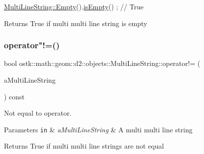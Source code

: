 \begin{DoxyCode}
\hyperlink{classostk_1_1math_1_1geom_1_1d2_1_1objects_1_1_multi_line_string_a1f0815649194309c185ac3020b9d80a2}{MultiLineString::Empty}().\hyperlink{classostk_1_1math_1_1geom_1_1d2_1_1objects_1_1_multi_line_string_a5d9130266958b3cddbcfd9ac085074f9}{isEmpty}() ; \textcolor{comment}{// True}
\end{DoxyCode}


\begin{DoxyReturn}{Returns}
True if multi multi line string is empty 
\end{DoxyReturn}
\mbox{\label{classostk_1_1math_1_1geom_1_1d2_1_1objects_1_1_multi_line_string_a124780190c563f303f81bff8e25ed742}} 
\subsubsection{\texorpdfstring{operator"!=()}{operator!=()}}
{\footnotesize\ttfamily bool ostk\+::math\+::geom\+::d2\+::objects\+::\+Multi\+Line\+String\+::operator!= (\begin{DoxyParamCaption}\item[{const \hyperlink{classostk_1_1math_1_1geom_1_1d2_1_1objects_1_1_multi_line_string}{Multi\+Line\+String} \&}]{a\+Multi\+Line\+String }\end{DoxyParamCaption}) const}



Not equal to operator. 


\begin{DoxyParams}[1]{Parameters}
\mbox{\tt in}  & {\em a\+Multi\+Line\+String} & A multi multi line string \\
\hline
\end{DoxyParams}
\begin{DoxyReturn}{Returns}
True if multi multi line strings are not equal 
\end{DoxyReturn}
\mbox{\label{classostk_1_1math_1_1geom_1_1d2_1_1objects_1_1_multi_line_string_af0bbb61f35a16ac8c61283221d2ddc43}} 
